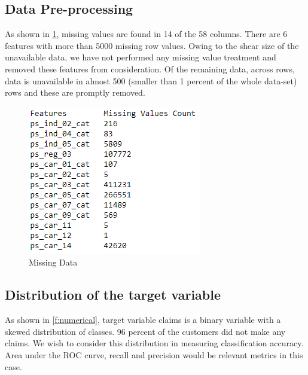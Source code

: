 \subsection{Data Pre-processing}

As shown in \ref{f:missing}, missing values are found in 14 of the 58 columns. There are 6 features with more than 5000 missing row values. Owing to the shear size of the unavailable data, we have not performed any missing value treatment and removed these features from consideration. Of the remaining data, across rows, data is unavailable in almost 500 (smaller than 1 percent of the whole data-set) rows and these are promptly removed.

\begin{figure}
  \centering\includegraphics[width=\columnwidth]{images/missingdata}
  \caption{Missing Data}\label{f:missing}
\end{figure}

\subsection{Distribution of the target variable}
As shown in \ref{f:numerical}, target variable claims is a binary variable with a skewed distribution of classes. 96 percent of the customers did not make any claims. We wish to consider this distribution in measuring classification accuracy. Area under the ROC curve, recall and precision would be relevant metrics in this case.
 
